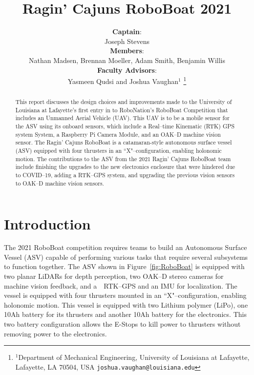 \documentclass[letterpaper, 12 pt, conference]{ieeeconf}
\title{\LARGE \bf Ragin' Cajuns RoboBoat 2021}
\author{\textbf{Captain}:\\Joseph Stevens \\
\textbf{Members}:\\Nathan Madsen, Brennan Moeller, Adam Smith, Benjamin Willis\\
\textbf{Faculty Advisors}:\\Yasmeen Qudsi and Joshua Vaughan$^{1}$%
\thanks{$^{1}$Department of Mechanical Engineering,
        University of Louisiana at Lafayette, Lafayette, LA 70504, USA
        {\tt\small joshua.vaughan@louisiana.edu}}}
\begin{document}
\thispagestyle{empty}
\maketitle
\begin{abstract}
This report discusses the design choices and improvements made to the University of Louisiana at Lafayette's first entry in to RoboNation's RoboBoat Competition that includes an Unmanned Aerial Vehicle (UAV). This UAV is to be a mobile sensor for the ASV using its onboard sensors, which include a Real--time Kinematic (RTK) GPS system System, a Raspberry Pi Camera Module, and an OAK--D machine vision sensor. The Ragin' Cajuns RoboBoat is a catamaran-style autonomous surface vessel (ASV) equipped with four thrusters in an ``X"--configuration, enabling holonomic motion. The contributions to the ASV from the 2021 Ragin' Cajuns RoboBoat team include finishing the upgrades to the new electronics enclosure that were hindered due to COVID--19, adding a RTK--GPS system, and upgrading the previous vision sensors to OAK--D machine vision sensors.
\end{abstract}
% 

\section{Introduction}
% 
The 2021 RoboBoat competition requires teams to build an Autonomous Surface Vessel (ASV) capable of performing various tasks that require several subsystems to function together. The ASV shown in Figure~\ref{fig:RoboBoat} is equipped with two planar LiDARs for depth perception, two OAK--D stereo cameras for machine vision feedback, and a~~RTK--GPS and an IMU for localization. The vessel is equipped with four thrusters mounted in an ``X"--configuration, enabling holonomic motion. This vessel is equipped with two Lithium polymer (LiPo), one 10Ah battery for its thrusters and another 10Ah battery for the electronics. This two battery configuration allows the E-Stops to kill power to thrusters without removing power to the electronics. 
\end{document}
